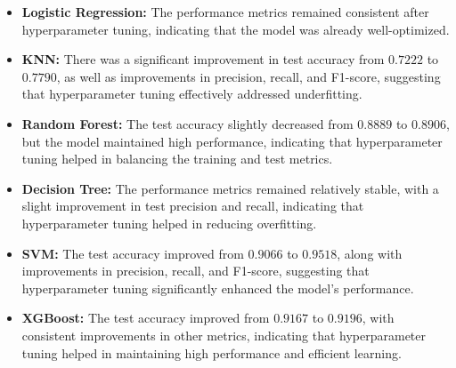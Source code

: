 \documentclass[12pt]{report}
\begin{document}
\vspace{-1.5em}
\begin{itemize}
	\setlength\itemsep{-1.5em}
	\item \textbf{Logistic Regression:} The performance metrics remained consistent after hyperparameter tuning, indicating that the model was already well-optimized.
	\item \textbf{KNN:} There was a significant improvement in test accuracy from $0.7222$ to $0.7790$, as well as improvements in precision, recall, and F1-score, suggesting that hyperparameter tuning effectively addressed underfitting.
	\item \textbf{Random Forest:} The test accuracy slightly decreased from $0.8889$ to $0.8906$, but the model maintained high performance, indicating that hyperparameter tuning helped in balancing the training and test metrics.
	\item \textbf{Decision Tree:} The performance metrics remained relatively stable, with a slight improvement in test precision and recall, indicating that hyperparameter tuning helped in reducing overfitting.
	\item \textbf{SVM:} The test accuracy improved from $0.9066$ to $0.9518$, along with improvements in precision, recall, and F1-score, suggesting that hyperparameter tuning significantly enhanced the model's performance.
	\item \textbf{XGBoost:} The test accuracy improved from $0.9167$ to $0.9196$, with consistent improvements in other metrics, indicating that hyperparameter tuning helped in maintaining high performance and efficient learning.
\end{itemize}
\end{document}

